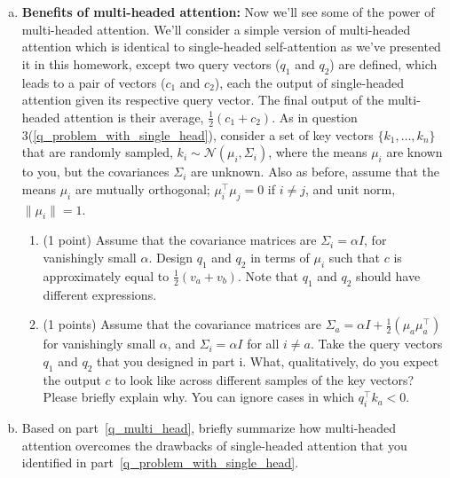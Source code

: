 \begin{enumerate}[(a)]
\item {} \label{q_multi_head} \textbf{Benefits of multi-headed attention:}
Now we'll see some of the power of multi-headed attention.
We'll consider a simple version of multi-headed attention which is identical to single-headed self-attention as we've presented it in this homework, except two query vectors ($q_1$ and $q_2$) are defined, which leads to a pair of vectors ($c_1$ and $c_2$), each the output of single-headed attention given its respective query vector.
The final output of the multi-headed attention is their average, $\frac{1}{2}(c_1+c_2)$.
As in question 3(\ref{q_problem_with_single_head}), consider a set of key vectors $\{k_1,\dots,k_n\}$ that are randomly sampled, $k_i\sim \mathcal{N}(\mu_i, \Sigma_i)$, where the means $\mu_i$ are known to you, but the covariances $\Sigma_i$ are unknown.
Also as before, assume that the means $\mu_i$ are mutually orthogonal; $\mu_i^\top \mu_j = 0$ if $i\not=j$, and unit norm, $\|\mu_i\|=1$.
    \begin{enumerate}[label=\roman*.]
    \item (1 point) Assume that the covariance matrices are $\Sigma_i=\alpha I$, for vanishingly small $\alpha$.
    Design $q_1$ and $q_2$ in terms of $\mu_i$ such that $c$ is approximately equal to $\frac{1}{2}(v_a+v_b)$. 
    Note that $q_1$ and $q_2$ should have different expressions. 

    \item (1 points) Assume that the covariance matrices are $\Sigma_a=\alpha I + \frac{1}{2}(\mu_a\mu_a^\top)$ for vanishingly small $\alpha$, and $\Sigma_i=\alpha I$  for all $i \neq a$.
    Take the query vectors $q_1$ and $q_2$ that you designed in part i.
    What, qualitatively, do you expect the output $c$ to look like across different samples of the key vectors? Please briefly explain why. You can ignore cases in which $q_i^\top k_a < 0$.

    \end{enumerate}

\item {}  Based on part~\ref{q_multi_head}, briefly summarize how multi-headed attention overcomes the drawbacks of single-headed attention that you identified in part~\ref{q_problem_with_single_head}.


\end{enumerate}